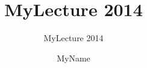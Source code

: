 \documentclass[9pt]{beamer}
\title{MyLecture 2014}
\subtitle{MyLecture 2014}
\author{MyName}
\institute{MyInstitute \\ MyDepartment }
\numberwithin{equation}{section}
\begin{document}
\begin{frame}[plain]
  \titlepage
\end{frame}


\end{document}
